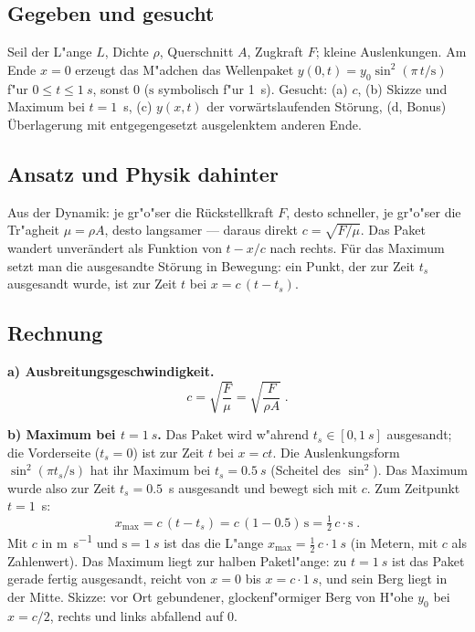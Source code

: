 
\subsection*{Gegeben und gesucht}
Seil der L"ange $L$, Dichte $\rho$, Querschnitt $A$, Zugkraft $F$; kleine
Auslenkungen. Am Ende $x=0$ erzeugt das M"adchen das Wellenpaket
$y(0,t)=y_0\sin^2(\pi\,t/\mathrm{s})$ f"ur $0\le t\le\qty{1}{s}$, sonst $0$
($\mathrm{s}$ symbolisch f"ur \qty{1}{s}). Gesucht: (a) $c$, (b) Skizze und
Maximum bei $t=1$~s, (c) $y(x,t)$ der vorwärtslaufenden Störung, (d,
Bonus) Überlagerung mit entgegengesetzt ausgelenktem anderen Ende.

\subsection*{Ansatz und Physik dahinter}
Aus der Dynamik: je gr"o"ser die Rückstellkraft $F$, desto schneller, je
gr"o"ser die Tr"agheit $\mu=\rho A$, desto langsamer --- daraus direkt
$c=\sqrt{F/\mu}$. Das Paket wandert unverändert als Funktion von $t-x/c$
nach rechts. Für das Maximum setzt man die ausgesandte Störung in Bewegung:
ein Punkt, der zur Zeit $t_s$ ausgesandt wurde, ist zur Zeit $t$ bei
$x=c\,(t-t_s)$.

\subsection*{Rechnung}
\textbf{a) Ausbreitungsgeschwindigkeit.}
\begin{equation}
  c=\sqrt{\frac{F}{\mu}}=\sqrt{\frac{F}{\rho A}}\;.
\end{equation}

\textbf{b) Maximum bei $t=\qty{1}{s}$.} Das Paket wird w"ahrend
$t_s\in[0,1~s]$ ausgesandt; die Vorderseite ($t_s=0$) ist zur Zeit $t$ bei
$x=ct$. Die Auslenkungsform $\sin^2(\pi t_s/\mathrm{s})$ hat ihr Maximum bei
$t_s=\qty{0.5}{s}$ (Scheitel des $\sin^2$). Das Maximum wurde also zur Zeit
$t_s=0.5$~s ausgesandt und bewegt sich mit $c$. Zum Zeitpunkt $t=1$~s:
\begin{equation}
  x_{\max}=c\,(t-t_s)=c\,(1-0.5)\,\mathrm{s}
  =\tfrac12\,c\cdot\mathrm{s}
  \;.
\end{equation}
Mit $c$ in \unit{\metre\per\second} und $\mathrm s=\qty{1}{s}$ ist das die
L"ange $x_{\max}=\tfrac12\,c\cdot\qty{1}{s}$ (in Metern, mit $c$ als
Zahlenwert).
Das Maximum liegt zur halben Paketl"ange: zu $t=\qty{1}{s}$ ist das Paket
gerade fertig ausgesandt, reicht von $x=0$ bis $x=c\cdot\qty{1}{s}$, und sein
Berg liegt in der Mitte. Skizze: vor Ort gebundener, glockenf"ormiger Berg von
H"ohe $y_0$ bei $x=c/2$, rechts und links abfallend auf $0$.

